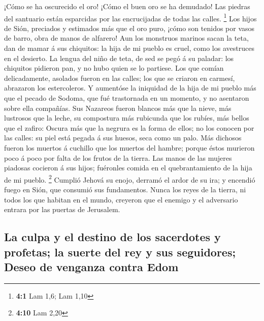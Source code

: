  ¡Cómo se ha oscurecido el oro! ¡Cómo el buen oro se ha
demudado! Las piedras del santuario están esparcidas por las
encrucijadas de todas las calles. \footnote{\textbf{4:1} Lam 1,6; Lam
  1,10}  Los hijos de Sión, preciados y estimados más que el
oro puro, ¡cómo son tenidos por vasos de barro, obra de manos de
alfarero!  Aun los monstruos marinos sacan la teta, dan de
mamar á sus chiquitos: la hija de mi pueblo es cruel, como los
avestruces en el desierto.  La lengua del niño de teta, de
sed se pegó á su paladar: los chiquitos pidieron pan, y no hubo quien se
lo partiese.  Los que comían delicadamente, asolados fueron
en las calles; los que se criaron en carmesí, abrazaron los
estercoleros.  Y aumentóse la iniquidad de la hija de mi
pueblo más que el pecado de Sodoma, que fué trastornada en un momento, y
no asentaron sobre ella compañías.  Sus Nazareos fueron
blancos más que la nieve, más lustrosos que la leche, su compostura más
rubicunda que los rubíes, más bellos que el zafiro:  Oscura
más que la negrura es la forma de ellos; no los conocen por las calles:
su piel está pegada á sus huesos, seca como un palo.  Más
dichosos fueron los muertos á cuchillo que los muertos del hambre;
porque éstos murieron poco á poco por falta de los frutos de la tierra.
 Las manos de las mujeres piadosas cocieron á sus hijos;
fuéronles comida en el quebrantamiento de la hija de mi pueblo.
\footnote{\textbf{4:10} Lam 2,20}  Cumplió Jehová su enojo,
derramó el ardor de su ira; y encendió fuego en Sión, que consumió sus
fundamentos.  Nunca los reyes de la tierra, ni todos los
que habitan en el mundo, creyeron que el enemigo y el adversario entrara
por las puertas de Jerusalem.

\hypertarget{la-culpa-y-el-destino-de-los-sacerdotes-y-profetas-la-suerte-del-rey-y-sus-seguidores-deseo-de-venganza-contra-edom}{%
\subsection{La culpa y el destino de los sacerdotes y profetas; la
suerte del rey y sus seguidores; Deseo de venganza contra
Edom}\label{la-culpa-y-el-destino-de-los-sacerdotes-y-profetas-la-suerte-del-rey-y-sus-seguidores-deseo-de-venganza-contra-edom}}

